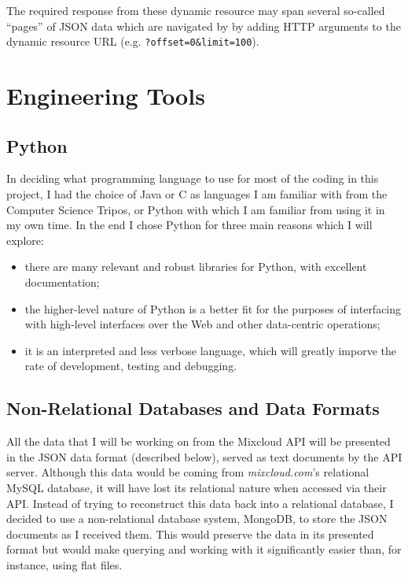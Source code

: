 \documentclass[a4paper,12pt,twoside,notitlepage]{report}
\def\mixurl{\emph{mixcloud.com}}
\begin{document}
The required response from these dynamic resource may span several
so-called ``pages'' of JSON data which are navigated by by adding HTTP
arguments to the dynamic resource URL (e.g. \texttt{?offset=0\&limit=100}).


\section{Engineering Tools}

\subsection{Python}

In deciding what programming language to use for most of the coding in this
project, I had the choice of Java or C as languages I am familiar with from the
Computer Science Tripos, or Python with which I am familiar from using it in my
own time. In the end I chose Python for three main reasons which I will explore:
\begin{itemize}
 \item there are many relevant and robust libraries for Python, with excellent
documentation; 
 \item the higher-level nature of Python is a better fit for the purposes
of interfacing with high-level interfaces over the Web and other data-centric
operations;
 \item it is an interpreted and less verbose language, which will greatly
imporve the rate of development, testing and debugging. 
\end{itemize}

\subsection{Non-Relational Databases and Data Formats}
\label{subsec:nonrel}

All the data that I will be working on from the Mixcloud API will be presented
in the JSON data format (described below), served as text documents by the API
server. Although this data would be coming from \mixurl's relational MySQL
database, it will have lost its relational nature when accessed via their API.
Instead of trying to reconstruct this data back into a relational database, I
decided to use a non-relational database system, MongoDB, to store the JSON
documents as I received them. This would preserve the data in its presented
format but would make querying and working with it significantly easier than,
for instance, using flat files.
\end{document}
